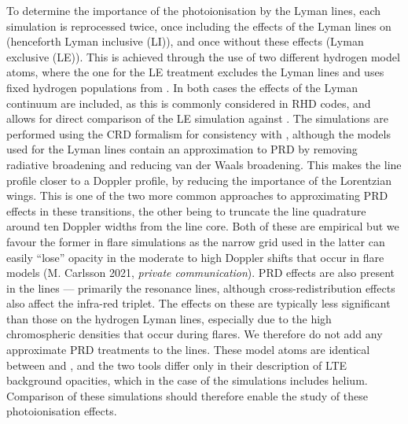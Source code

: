 To determine the importance of the photoionisation by the Lyman lines, each \Radyn{} simulation is reprocessed twice, once including the effects of the Lyman lines on \Caii{} (henceforth Lyman inclusive (LI)), and once without these effects (Lyman exclusive (LE)).
This is achieved through the use of two different hydrogen model atoms, where the one for the LE treatment excludes the Lyman lines and uses fixed hydrogen populations from \Radyn{}.
In both cases the effects of the Lyman continuum are included, as this is commonly considered in RHD codes, and allows for direct comparison of the LE simulation against \Radyn{}.
The simulations are performed using the CRD formalism for consistency with \Radyn{}, although the models used for the Lyman lines contain an approximation to PRD by removing radiative broadening and reducing van der Waals broadening.
This makes the line profile closer to a Doppler profile, by reducing the importance of the Lorentzian wings.
This is one of the two more common approaches to approximating PRD effects in these transitions, the other being to truncate the line quadrature around ten Doppler widths from the line core.
Both of these are empirical but we favour the former in flare simulations as the narrow grid used in the latter can easily ``lose'' opacity in the moderate to high Doppler shifts that occur in flare models (M. Carlsson 2021, \emph{private communication}).
PRD effects are also present in the \Caii{} lines --- primarily the resonance lines, although cross-redistribution effects also affect the infra-red triplet.
The effects on these are typically less significant than those on the hydrogen Lyman lines, especially due to the high chromospheric densities that occur during flares.
We therefore do not add any approximate PRD treatments to the \Caii{} lines.
These model atoms are identical between \Radyn{} and \Lw{}, and the two tools differ only in their description of LTE background opacities, which in the case of the \Lw{} simulations includes helium.
Comparison of these simulations should therefore enable the study of these photoionisation effects.

